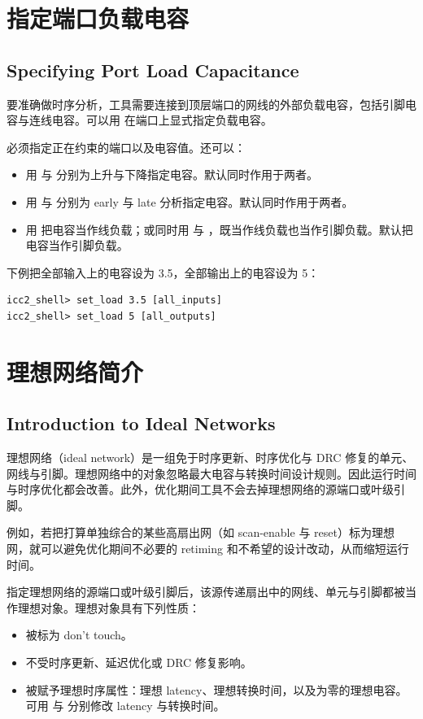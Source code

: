 \section{指定端口负载电容}
\subsection*{Specifying Port Load Capacitance}

要准确做时序分析，工具需要连接到顶层端口的网线的外部负载电容，包括引脚电容与连线电容。可以用  在端口上显式指定负载电容。

必须指定正在约束的端口以及电容值。还可以：
\begin{itemize}
  \item 用  与  分别为上升与下降指定电容。默认同时作用于两者。
  \item 用  与  分别为 early 与 late 分析指定电容。默认同时作用于两者。
  \item 用  把电容当作线负载；或同时用  与 ，既当作线负载也当作引脚负载。默认把电容当作引脚负载。
\end{itemize}

下例把全部输入上的电容设为 3.5，全部输出上的电容设为 5：
\begin{lstlisting}
icc2_shell> set_load 3.5 [all_inputs]
icc2_shell> set_load 5 [all_outputs]
\end{lstlisting}

\section{理想网络简介}
\subsection*{Introduction to Ideal Networks}

理想网络（ideal network）是一组免于时序更新、时序优化与 DRC 修复的单元、网线与引脚。理想网络中的对象忽略最大电容与转换时间设计规则。因此运行时间与时序优化都会改善。此外，优化期间工具不会去掉理想网络的源端口或叶级引脚。

例如，若把打算单独综合的某些高扇出网（如 scan-enable 与 reset）标为理想网，就可以避免优化期间不必要的 retiming 和不希望的设计改动，从而缩短运行时间。

指定理想网络的源端口或叶级引脚后，该源传递扇出中的网线、单元与引脚都被当作理想对象。理想对象具有下列性质：
\begin{itemize}
  \item 被标为 don't touch。
  \item 不受时序更新、延迟优化或 DRC 修复影响。
  \item 被赋予理想时序属性：理想 latency、理想转换时间，以及为零的理想电容。可用  与  分别修改 latency 与转换时间。
\end{itemize}

